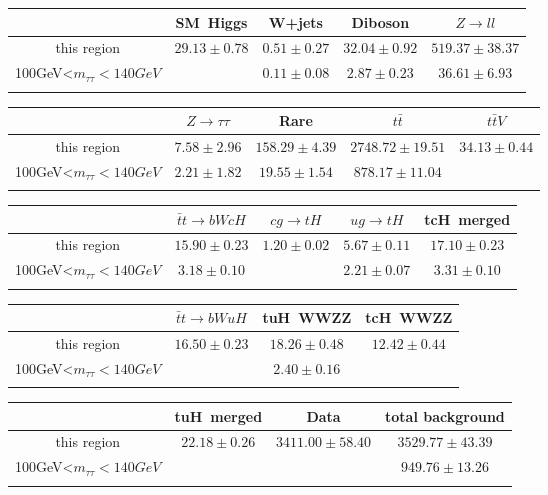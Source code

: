 \centering
\begin{tabular}{ccccc} \toprule\toprule
 & SM~Higgs & W+jets & Diboson & $Z\to ll$\\\midrule
this region & $29.13\pm0.78$ & $0.51\pm0.27$ & $32.04\pm0.92$ & $519.37\pm38.37$\\
100GeV<$m_{\tau\tau}<140GeV$ &  & $0.11\pm0.08$ & $2.87\pm0.23$ & $36.61\pm6.93$\\
\bottomrule\bottomrule\\
\end{tabular}
\begin{tabular}{ccccc} \toprule\toprule
 & $Z\to \tau\tau$ & Rare & $t\bar{t}$ & $t\bar{t}V$\\\midrule
this region & $7.58\pm2.96$ & $158.29\pm4.39$ & $2748.72\pm19.51$ & $34.13\pm0.44$\\
100GeV<$m_{\tau\tau}<140GeV$ & $2.21\pm1.82$ & $19.55\pm1.54$ & $878.17\pm11.04$ & \\
\bottomrule\bottomrule\\
\end{tabular}
\begin{tabular}{ccccc} \toprule\toprule
 & $\bar{t}t\to bWcH$ & $cg\to tH$ & $ug\to tH$ & tcH~merged\\\midrule
this region & $15.90\pm0.23$ & $1.20\pm0.02$ & $5.67\pm0.11$ & $17.10\pm0.23$\\
100GeV<$m_{\tau\tau}<140GeV$ & $3.18\pm0.10$ &  & $2.21\pm0.07$ & $3.31\pm0.10$\\
\bottomrule\bottomrule\\
\end{tabular}
\begin{tabular}{cccc} \toprule\toprule
 & $\bar{t}t\to bWuH$ & tuH~WWZZ & tcH~WWZZ\\\midrule
this region & $16.50\pm0.23$ & $18.26\pm0.48$ & $12.42\pm0.44$\\
100GeV<$m_{\tau\tau}<140GeV$ &  & $2.40\pm0.16$ & \\
\bottomrule\bottomrule\\
\end{tabular}
\begin{tabular}{cccc} \toprule\toprule
 & tuH~merged & Data & total background\\\midrule
this region & $22.18\pm0.26$ & $3411.00\pm58.40$ & $3529.77\pm43.39$\\
100GeV<$m_{\tau\tau}<140GeV$ &  &  & $949.76\pm13.26$\\
\bottomrule\bottomrule\\
\end{tabular}
